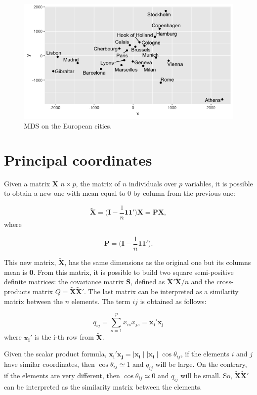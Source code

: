 \documentclass[11pt]{report}
\begin{document}
\begin{figure}[!ht]
\centering
    \includegraphics[scale = 0.5]{./images/europ_cities.png}
    \caption{MDS on the European cities.}
    \label{europ_cities}
\end{figure}


\section{Principal coordinates}
Given a matrix \textbf{X} $n \times p$, the matrix of $n$ 
individuals over $p$ variables, it is possible to obtain a new one with 
mean equal to 0 by column from the previous one:

\[
\mathbf{\widetilde{X}} = \Big( \mathbf{I} - \frac{1}{n} \mathbf{1}\mathbf{1'}\Big) \mathbf{X} = \mathbf{P}\mathbf{X},
\]
where 

\[
\mathbf{P} = \Big( \mathbf{I} - \frac{1}{n} \mathbf{1}\mathbf{1'}\Big).
\]

\indent This new matrix, $\mathbf{\widetilde{X}}$, has the same dimensions as 
the original one but its columns mean is \textbf{0}. From this matrix, it is 
possible to build two square semi-positive definite matrices: the covariance 
matrix \textbf{S}, defined as $\mathbf{\widetilde{X}'}\mathbf{\widetilde{X}}/n$ 
and the cross-products matrix $Q = \mathbf{\widetilde{X}}\mathbf{\widetilde{X}'}$. 
The last matrix can be interpreted as a similarity matrix between the $n$ elements. 
The term $ij$ is obtained as follows:

\begin{equation} \label{qij}
q_{ij} = \sum_{s=1}^{p} x_{is}x_{js} = \mathbf{x_i'} \mathbf{x_j}
\end{equation}
where $\mathbf{x_i}'$ is the i-th row from $\mathbf{\widetilde{X}}$. 

\indent Given the scalar product formula, 
${\mathbf{x_i'}\mathbf{x_j} =  \mid \mathbf{x_i} \mid \mid \mathbf{x_i} \mid \cos\theta_{ij}}$,
if the elements $i$ and $j$ have similar coordinates, then $\cos\theta_{ij} \simeq 1$
and $q_{ij}$ will be large. On the contrary, if the elements are very different,
then $\cos \theta_{ij} \simeq 0$ and $q_{ij}$ will be small. So, 
$\mathbf{\widetilde{X}}\mathbf{\widetilde{X}'}$ can be interpreted as the similarity
matrix between the elements.
\end{document}
